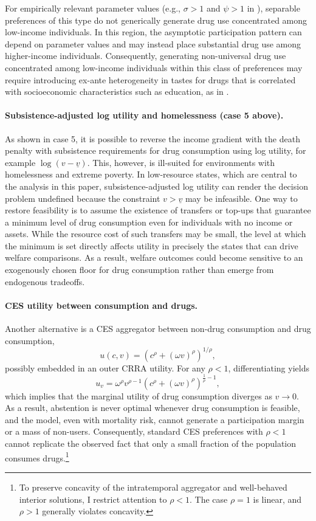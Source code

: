 For empirically relevant parameter values (e.g., $\sigma>1$ and $\psi>1$ in \citet{greenwood_guner_kopecky_2025_downward_spiral}), separable preferences of this type do not generically generate drug use concentrated among low-income individuals. In this region, the asymptotic participation pattern can depend on parameter values and may instead place substantial drug use among higher-income individuals. Consequently, generating non-universal drug use concentrated among low-income individuals within this class of preferences may require introducing ex-ante heterogeneity in tastes for drugs that is correlated with socioeconomic characteristics such as education, as in \citet{greenwood_guner_kopecky_2025_downward_spiral}.

\paragraph{Subsistence-adjusted log utility and homelessness (case 5 above).}
As shown in case 5, it is possible to reverse the income gradient with the death penalty with subsistence requirements for drug consumption using log utility, for example $\log(v-\underline v)$. This, however, is ill-suited for environments with homelessness and extreme poverty. In low-resource states, which are central to the analysis in this paper, subsistence-adjusted log utility can render the decision problem undefined because the constraint $v>\underline v$ may be infeasible. One way to restore feasibility is to assume the existence of transfers or top-ups that guarantee a minimum level of drug consumption even for individuals with no income or assets. While the resource cost of such transfers may be small, the level at which the minimum is set directly affects utility in precisely the states that can drive welfare comparisons. As a result, welfare outcomes could become sensitive to an exogenously chosen floor for drug consumption rather than emerge from endogenous tradeoffs.

\paragraph{CES utility between consumption and drugs.}
Another alternative is a CES aggregator between non-drug consumption and drug consumption,
\[
u(c,v)=\left(c^{\rho}+(\omega v)^{\rho}\right)^{1/\rho},
\]
possibly embedded in an outer CRRA utility. For any $\rho<1$, differentiating yields
\[
u_v=\omega^{\rho} v^{\rho-1}\left(c^{\rho}+(\omega v)^{\rho}\right)^{\frac{1}{\rho}-1},
\]
which implies that the marginal utility of drug consumption diverges as $v\to 0$. As a result, abstention is never optimal whenever drug consumption is feasible, and the model, even with mortality risk, cannot generate a participation margin or a mass of non-users. Consequently, standard CES preferences with $\rho<1$ cannot replicate the observed fact that only a small fraction of the population consumes drugs.\footnote{To preserve concavity of the intratemporal aggregator and well-behaved interior solutions, I restrict attention to $\rho<1$. The case $\rho=1$ is linear, and $\rho>1$ generally violates concavity.}

